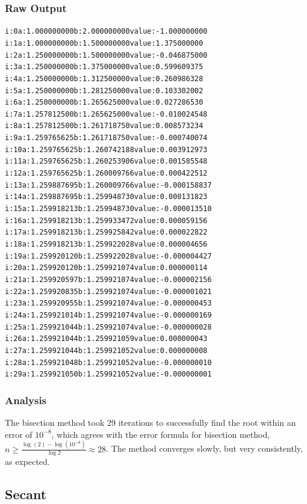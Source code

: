 \documentclass[11pt]{article} %
\begin{document}
\subsubsection*{Raw Output}
\begin{alltt}
i: 0	a: 1.000000000	b: 2.000000000	value: -1.000000000 
i: 1	a: 1.000000000	b: 1.500000000	value: 1.375000000 
i: 2	a: 1.250000000	b: 1.500000000	value: -0.046875000 
i: 3	a: 1.250000000	b: 1.375000000	value: 0.599609375 
i: 4	a: 1.250000000	b: 1.312500000	value: 0.260986328 
i: 5	a: 1.250000000	b: 1.281250000	value: 0.103302002 
i: 6	a: 1.250000000	b: 1.265625000	value: 0.027286530 
i: 7	a: 1.257812500	b: 1.265625000	value: -0.010024548 
i: 8	a: 1.257812500	b: 1.261718750	value: 0.008573234 
i: 9	a: 1.259765625	b: 1.261718750	value: -0.000740074 
i: 10	a: 1.259765625	b: 1.260742188	value: 0.003912973 
i: 11	a: 1.259765625	b: 1.260253906	value: 0.001585548 
i: 12	a: 1.259765625	b: 1.260009766	value: 0.000422512 
i: 13	a: 1.259887695	b: 1.260009766	value: -0.000158837 
i: 14	a: 1.259887695	b: 1.259948730	value: 0.000131823 
i: 15	a: 1.259918213	b: 1.259948730	value: -0.000013510 
i: 16	a: 1.259918213	b: 1.259933472	value: 0.000059156 
i: 17	a: 1.259918213	b: 1.259925842	value: 0.000022822 
i: 18	a: 1.259918213	b: 1.259922028	value: 0.000004656 
i: 19	a: 1.259920120	b: 1.259922028	value: -0.000004427 
i: 20	a: 1.259920120	b: 1.259921074	value: 0.000000114 
i: 21	a: 1.259920597	b: 1.259921074	value: -0.000002156 
i: 22	a: 1.259920835	b: 1.259921074	value: -0.000001021 
i: 23	a: 1.259920955	b: 1.259921074	value: -0.000000453 
i: 24	a: 1.259921014	b: 1.259921074	value: -0.000000169 
i: 25	a: 1.259921044	b: 1.259921074	value: -0.000000028 
i: 26	a: 1.259921044	b: 1.259921059	value: 0.000000043 
i: 27	a: 1.259921044	b: 1.259921052	value: 0.000000008 
i: 28	a: 1.259921048	b: 1.259921052	value: -0.000000010 
i: 29	a: 1.259921050	b: 1.259921052	value: -0.000000001 
\end{alltt}

\subsubsection*{Analysis}
The bisection method took 29 iterations to successfully find the root within an error of $10^{-8}$,  which agrees with the error formula for bisection method, $n \geq \frac{\log(2) - \log(10^{-8})}{\log 2} \approx  28$.  The method converges slowly, but very consistently, as expected.
\subsection*{Secant}
\end{document}
